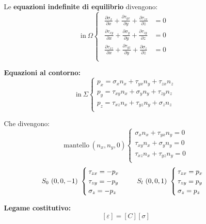 \documentclass{article}
\begin{document}
\begin{adjustwidth}{2in}{}
	Le\textbf{ equazioni indefinite di equilibrio} divengono:
\[ \text{in} ~ \Omega
\begin{cases}
	\begin{aligned}
		\frac{\partial\sigma_x}{\partial x} + \frac{\partial \tau_{yx}}{\partial y} + \frac{\partial \tau_{zx}}{\partial z} & =0 \\
		
		\frac{\partial \tau_{xy}}{\partial x} + \frac{\partial\sigma_y}{\partial y} + \frac{\partial \tau_{zy}}{\partial z} & =0 \\
		
		\frac{\partial \tau_{xz}}{\partial x} + \frac{\partial \tau_{yz}}{\partial y} + \frac{\partial\sigma_z}{\partial z} & =0 \\
	\end{aligned}
\end{cases}
\]

	\textbf{Equazioni al contorno:} 
\[
\text{in} ~ \Sigma \begin{cases}
	p_x = \sigma_x n_x + \tau_{yx}n_y + \tau_{zx}n_z \\
	p_y = \tau_{xy}n_x + \sigma_y n_y + \tau_{zy}n_z \\
	p_z = \tau_{xz}n_x + \tau_{yz}n_y + \sigma_z n_z \\
\end{cases}
\]

	Che divengono:
\[
\text{mantello} ~ (n_x,n_y,0) \begin{cases}
\sigma_x n_x + \tau_{yx}n_y =0 \\
\tau_{xy}n_x + \sigma_y n_y =0 \\
\tau_{xz}n_x + \tau_{yz}n_y =0 \\
\end{cases} 
\]
\[
\text{$S_0$} ~ (0,0,-1) ~ \begin{cases}
	\tau_{zx} = -p_x \\
	\tau_{zy} = -p_y \\
	\sigma_z = -p_z \\
\end{cases}
\hspace{0.5cm}
\text{$S_l$} ~ (0,0,1) ~ \begin{cases}
	\tau_{zx} = p_x \\
	\tau_{zy} = p_y \\
	\sigma_z = p_z \\
\end{cases}
\]

\textbf{Legame costitutivo:}
\[ [\varepsilon] = [C][\sigma]\]


\end{adjustwidth}
\end{document}
